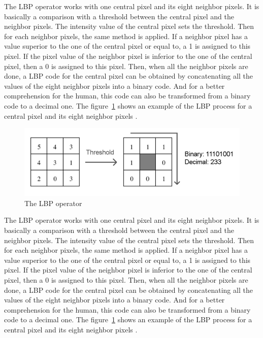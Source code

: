 \noindent The LBP operator works with one central pixel and its eight neighbor pixels. It is basically a comparison with a threshold between the central pixel and the neighbor pixels. The intensity value of the central pixel sets the threshold. Then for each neighbor pixels, the same method is applied. If a neighbor pixel has a value superior to the one of the central pixel or equal to, a 1 is assigned to this pixel. If the pixel value of the neighbor pixel is inferior to the one of the central pixel, then a 0 is assigned to this pixel. Then, when all the neighbor pixels are done, a LBP code for the central pixel can be obtained by concatenating all the values of the eight neighbor pixels into a binary code. And for a better comprehension for the human, this code can also be transformed from a binary code to a decimal one. The figure~\ref{lbp_basic_operator} shows an example of the LBP process for a central pixel and its eight neighbor pixels \cite{JUL07}.
\newline

\begin{figure}[!h]
\begin{center}
\noindent \includegraphics[scale=0.5]{figures/lbp_basic_operator} 
\newline
\caption{The LBP operator}
\label{lbp_basic_operator}
\end{center} 
\end{figure}

\noindent The LBP operator works with one central pixel and its eight neighbor pixels. It is basically a comparison with a threshold between the central pixel and the neighbor pixels. The intensity value of the central pixel sets the threshold. Then for each neighbor pixels, the same method is applied. If a neighbor pixel has a value superior to the one of the central pixel or equal to, a 1 is assigned to this pixel. If the pixel value of the neighbor pixel is inferior to the one of the central pixel, then a 0 is assigned to this pixel. Then, when all the neighbor pixels are done, a LBP code for the central pixel can be obtained by concatenating all the values of the eight neighbor pixels into a binary code. And for a better comprehension for the human, this code can also be transformed from a binary code to a decimal one. The figure~\ref{lbp_basic_operator} shows an example of the LBP process for a central pixel and its eight neighbor pixels \cite{JUL07}.
\newline


